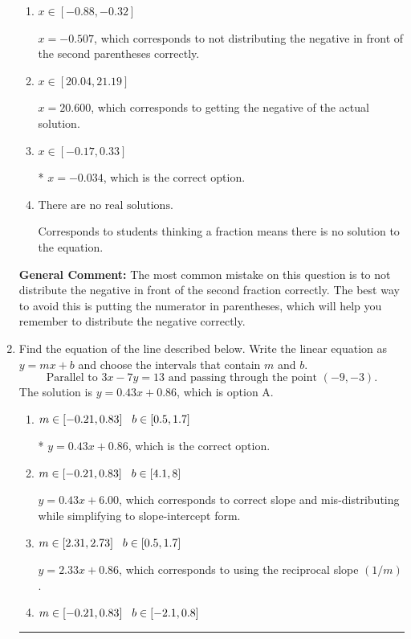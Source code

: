 \documentclass{extbook}[14pt]
\newcommand{\litem}[1]{\item #1

\rule{\textwidth}{0.4pt}}
\begin{document}
\begin{enumerate}
{\begin{enumerate}[label=\Alph*.]
$x = 0.507$, which corresponds to not distributing the negative in front of the first parentheses correctly.
\item \( x \in [-0.88, -0.32] \)

$x = -0.507$, which corresponds to not distributing the negative in front of the second parentheses correctly.
\item \( x \in [20.04, 21.19] \)

$x = 20.600$, which corresponds to getting the negative of the actual solution.
\item \( x \in [-0.17, 0.33] \)

* $x = -0.034$, which is the correct option.
\item \( \text{There are no real solutions.} \)

Corresponds to students thinking a fraction means there is no solution to the equation.
\end{enumerate}

\textbf{General Comment:} The most common mistake on this question is to not distribute the negative in front of the second fraction correctly. The best way to avoid this is putting the numerator in parentheses, which will help you remember to distribute the negative correctly.
}
\litem{
Find the equation of the line described below. Write the linear equation as $ y=mx+b $ and choose the intervals that contain $m$ and $b$.
\[ \text{Parallel to } 3 x - 7 y = 13 \text{ and passing through the point } (-9, -3). \]
The solution is \( y = 0.43x + 0.86 \), which is option A.\begin{enumerate}[label=\Alph*.]
\item \( m \in [-0.21, 0.83] \hspace*{3mm} b \in [0.5, 1.7] \)

* $y = 0.43x + 0.86$, which is the correct option.
\item \( m \in [-0.21, 0.83] \hspace*{3mm} b \in [4.1, 8] \)

 $y = 0.43x + 6.00$, which corresponds to correct slope and mis-distributing while simplifying to slope-intercept form.
\item \( m \in [2.31, 2.73] \hspace*{3mm} b \in [0.5, 1.7] \)

 $y = 2.33x + 0.86$, which corresponds to using the reciprocal slope $(1/m)$.
\item \( m \in [-0.21, 0.83] \hspace*{3mm} b \in [-2.1, 0.8] \)


\end{enumerate}}
\end{enumerate}
\end{document}
